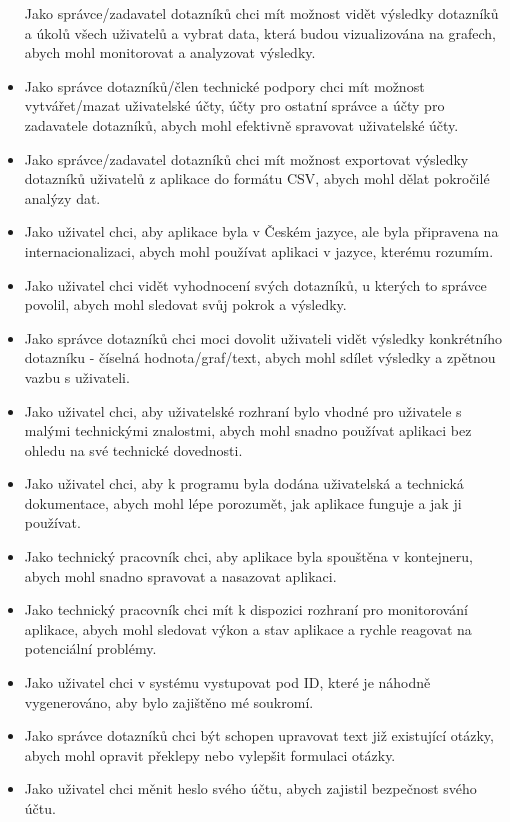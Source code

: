 \begin{itemize}
  Jako správce/zadavatel dotazníků chci mít možnost vidět výsledky dotazníků a úkolů všech uživatelů a vybrat data, která budou vizualizována na grafech, abych mohl monitorovat a analyzovat výsledky.
  \item
  Jako správce dotazníků/člen technické podpory chci mít možnost vytvářet/mazat uživatelské účty, účty pro ostatní správce a účty pro zadavatele dotazníků, abych mohl efektivně spravovat uživatelské účty.
  \item
  Jako správce/zadavatel dotazníků chci mít možnost exportovat výsledky dotazníků uživatelů z aplikace do formátu CSV, abych mohl dělat pokročilé analýzy dat.
  \item
  Jako uživatel chci, aby aplikace byla v Českém jazyce, ale byla připravena na internacionalizaci, abych mohl používat aplikaci v jazyce, kterému rozumím.
  \item
  Jako uživatel chci vidět vyhodnocení svých dotazníků, u kterých to správce povolil, abych mohl sledovat svůj pokrok a výsledky.
  \item
  Jako správce dotazníků chci moci dovolit uživateli vidět výsledky konkrétního dotazníku - číselná hodnota/graf/text, abych mohl sdílet výsledky a zpětnou vazbu s uživateli.
  \item
  Jako uživatel chci, aby uživatelské rozhraní bylo vhodné pro uživatele s malými technickými znalostmi, abych mohl snadno používat aplikaci bez ohledu na své technické dovednosti.
  \item
  Jako uživatel chci, aby k programu byla dodána uživatelská a technická dokumentace, abych mohl lépe porozumět, jak aplikace funguje a jak ji používat.
  \item
  Jako technický pracovník chci, aby aplikace byla spouštěna v kontejneru, abych mohl snadno spravovat a nasazovat aplikaci.
  \item
  Jako technický pracovník chci mít k dispozici rozhraní pro monitorování aplikace, abych mohl sledovat výkon a stav aplikace a rychle reagovat na potenciální problémy.
  \item
  Jako uživatel chci v systému vystupovat pod ID, které je náhodně vygenerováno, aby bylo zajištěno mé soukromí.
  \item
  Jako správce dotazníků chci být schopen upravovat text již existující otázky, abych mohl opravit překlepy nebo vylepšit formulaci otázky.
  \item
  Jako uživatel chci měnit heslo svého účtu, abych zajistil bezpečnost svého účtu.
\end{itemize}

